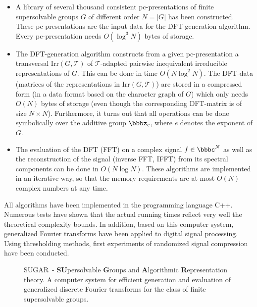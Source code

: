 \documentclass{llncs}
\def\T{{\mathcal T}}
\def\Z{{\bbbz}}
\def\C{{\bbbc}}
\def\Irr{{\mathrm{Irr}}}
\newcommand{\NameCS}{SUGAR}
\begin{document}
\begin{itemize}
\item [$\bullet$] A library of several thousand consistent 
	pc-presentations of 
	finite supersolvable groups $G$ of different order $N=|G|$
	has been constructed.    
	These pc-presentations are the input data for the
	DFT-generation algorithm. Every pc-presentation needs
	$O(\log^3N)$ bytes of storage. 
\item [$\bullet$] The DFT-generation algorithm constructs from a given 
	pc-presentation a trans\-ver\-sal $\Irr(G,\T)$ of 
	$\T$-adapted pairwise inequivalent irreducible 
	representations of $G$. This can be done 
	in time $O(N\log^2 N)$.
	The DFT-data (matrices of the representations in $\Irr(G,\T)$) 
	are stored in a compressed form (in a data format based on 
	the character graph of $G$) which only needs $O(N)$ bytes of 
	storage (even though the corresponding DFT-matrix is
	of size $N\times N$). Furthermore, it turns out that all
	operations can be done symbolically over the additive group 
	$\Z_e$, where $e$ denotes the exponent of $G$.
\item [$\bullet$] The evaluation of the DFT (FFT) on a complex signal $f\in \C^N$
	as well as the reconstruction of the signal (inverse FFT, IFFT) 
	from its spectral components can be done in $O(N\log N)$. 
	These algorithms are implemented in an
	iterative way, so that the memory requirements are 
	at most $O(N)$ complex numbers at any time.
\end{itemize}
All algorithms have been implemented in the programming language
C++. Numerous tests have shown that the actual running times
reflect very well the theoretical complexity bounds. 
In addition, based on this computer system, generalized Fourier
transforms have been applied to digital signal processing. 
Using thresholding methods, first experiments of 
randomized signal compression have been conducted.

\vspace{0.2cm}

\begin{figure}[ht]
   	\centerline{
}
    	\caption{\label{fig_system} \NameCS\, - 
    	{\bf SU}persolvable {\bf G}roups and {\bf A}lgorithmic 
	{\bf R}epresentation theory. 
	A computer system for efficient generation and
	evaluation of generalized discrete Fourier transforms
	for the class of finite supersolvable groups.}
\end{figure}
\end{document}
